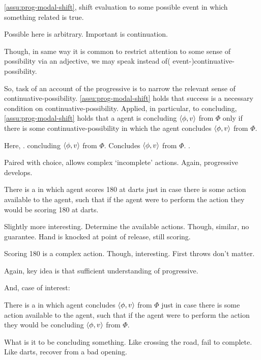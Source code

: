 \begin{note}
  \autoref{assu:prog-modal-shift}, shift evaluation to some possible event in which something related is true.

  Possible here is arbitrary.
  Important is continuation.

  Though, in same way it is common to restrict attention to some sense of possibility via an adjective, we may speak instead of( event-)continuative-possibility.

  So, task of an account of the progressive is to narrow the relevant sense of continuative-possibility.
  \autoref{assu:prog-modal-shift} holds that success is a necessary condition on continuative-possibility.
  Applied, in particular, to concluding, \autoref{assu:prog-modal-shift} holds that a agent is concluding \(\langle \phi, v \rangle\) from \(\Phi\) only if there is some continuative-possibility in which the agent concludes \(\langle \phi, v \rangle\) from \(\Phi\).

  Here, \fc{}.
  concluding \(\langle \phi, v \rangle\) from \(\Phi\).
  Concludes \(\langle \phi, v \rangle\) from \(\Phi\).
  .
\end{note}

\begin{note}
  Paired with choice, allows complex `incomplete' actions.
  Again, progressive develops.

  \begin{illustration}[Darts]
    There is a \pevent{} in which agent scores 180 at darts just in case there is some action available to the agent, such that if the agent were to perform the action they would be scoring 180 at darts.
  \end{illustration}

  Slightly more interesting.
  Determine the available actions.
  Though, similar, no guarantee.
  Hand is knocked at point of release, still scoring.

  Scoring 180 is a complex action.
  Though, interesting.
  First throws don't matter.

  Again, key idea is that sufficient understanding of progressive.

  And, case of interest:

  \begin{illustration}[Concluding]
    There is a \pevent{} in which agent concludes \(\langle \phi, v \rangle\) from \(\Phi\) just in case there is some action available to the agent, such that if the agent were to perform the action they would be concluding \(\langle \phi, v \rangle\) from \(\Phi\).
  \end{illustration}

  What is it to be concluding something.
  Like crossing the road, fail to complete.
  Like darts, recover from a bad opening.
\end{note}

